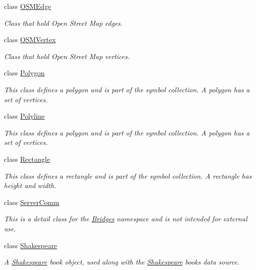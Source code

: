 \begin{DoxyCompactItemize}
class \mbox{\hyperlink{classbridges_1_1_o_s_m_edge}{O\+S\+M\+Edge}}
\begin{DoxyCompactList}\small\item\em Class that hold Open Street Map edges. \end{DoxyCompactList}\item 
class \mbox{\hyperlink{classbridges_1_1_o_s_m_vertex}{O\+S\+M\+Vertex}}
\begin{DoxyCompactList}\small\item\em Class that hold Open Street Map vertices. \end{DoxyCompactList}\item 
class \mbox{\hyperlink{classbridges_1_1_polygon}{Polygon}}
\begin{DoxyCompactList}\small\item\em This class defines a polygon and is part of the symbol collection. A polygon has a set of vertices. \end{DoxyCompactList}\item 
class \mbox{\hyperlink{classbridges_1_1_polyline}{Polyline}}
\begin{DoxyCompactList}\small\item\em This class defines a polygon and is part of the symbol collection. A polygon has a set of vertices. \end{DoxyCompactList}\item 
class \mbox{\hyperlink{classbridges_1_1_rectangle}{Rectangle}}
\begin{DoxyCompactList}\small\item\em This class defines a rectangle and is part of the symbol collection. A rectangle has height and width. \end{DoxyCompactList}\item 
class \mbox{\hyperlink{classbridges_1_1_server_comm}{Server\+Comm}}
\begin{DoxyCompactList}\small\item\em This is a detail class for the \mbox{\hyperlink{classbridges_1_1_bridges}{Bridges}} namespace and is not intended for external use. \end{DoxyCompactList}\item 
class \mbox{\hyperlink{classbridges_1_1_shakespeare}{Shakespeare}}
\begin{DoxyCompactList}\small\item\em A \mbox{\hyperlink{classbridges_1_1_shakespeare}{Shakespeare}} book object, used along with the \mbox{\hyperlink{classbridges_1_1_shakespeare}{Shakespeare}} books data source. \end{DoxyCompactList}\item 

\end{DoxyCompactItemize}

